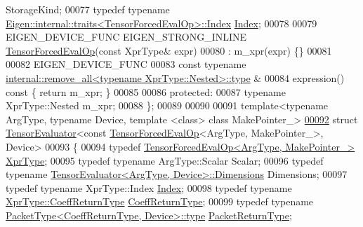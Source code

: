 \begin{DoxyCode}
       StorageKind;
00077   \textcolor{keyword}{typedef} \textcolor{keyword}{typename} \hyperlink{struct_eigen_1_1internal_1_1traits}{Eigen::internal::traits<TensorForcedEvalOp>::Index}
       \hyperlink{namespace_eigen_a62e77e0933482dafde8fe197d9a2cfde}{Index};
00078 
00079   EIGEN\_DEVICE\_FUNC EIGEN\_STRONG\_INLINE \hyperlink{class_eigen_1_1_tensor_forced_eval_op}{TensorForcedEvalOp}(\textcolor{keyword}{const} XprType& expr)
00080       : m\_xpr(expr) \{\}
00081 
00082     EIGEN\_DEVICE\_FUNC
00083     \textcolor{keyword}{const} \textcolor{keyword}{typename} \hyperlink{group___sparse_core___module}{internal::remove\_all<typename XprType::Nested>::type}
      &
00084     expression()\textcolor{keyword}{ const }\{ \textcolor{keywordflow}{return} m\_xpr; \}
00085 
00086   \textcolor{keyword}{protected}:
00087     \textcolor{keyword}{typename} XprType::Nested m\_xpr;
00088 \};
00089 
00090 
00091 \textcolor{keyword}{template}<\textcolor{keyword}{typename} ArgType, \textcolor{keyword}{typename} Device, \textcolor{keyword}{template} <\textcolor{keyword}{class}> \textcolor{keyword}{class }MakePointer\_>
\hyperlink{struct_eigen_1_1_tensor_evaluator_3_01const_01_tensor_forced_eval_op_3_01_arg_type_00_01_make_pointer___01_4_00_01_device_01_4}{00092} \textcolor{keyword}{struct }\hyperlink{struct_eigen_1_1_tensor_evaluator}{TensorEvaluator}<const \hyperlink{class_eigen_1_1_tensor_forced_eval_op}{TensorForcedEvalOp}<ArgType, MakePointer\_>, 
      Device>
00093 \{
00094   \textcolor{keyword}{typedef} \hyperlink{class_eigen_1_1_tensor_forced_eval_op}{TensorForcedEvalOp<ArgType, MakePointer\_>} 
      \hyperlink{class_eigen_1_1_tensor_forced_eval_op}{XprType};
00095   \textcolor{keyword}{typedef} \textcolor{keyword}{typename} ArgType::Scalar Scalar;
00096   \textcolor{keyword}{typedef} \textcolor{keyword}{typename} \hyperlink{struct_eigen_1_1_tensor_evaluator}{TensorEvaluator<ArgType, Device>::Dimensions}
       Dimensions;
00097   \textcolor{keyword}{typedef} \textcolor{keyword}{typename} XprType::Index \hyperlink{namespace_eigen_a62e77e0933482dafde8fe197d9a2cfde}{Index};
00098   \textcolor{keyword}{typedef} \textcolor{keyword}{typename} \hyperlink{group___sparse_core___module}{XprType::CoeffReturnType} 
      \hyperlink{group___sparse_core___module}{CoeffReturnType};
00099   \textcolor{keyword}{typedef} \textcolor{keyword}{typename} \hyperlink{group___sparse_core___module}{PacketType<CoeffReturnType, Device>::type} 
      \hyperlink{group___sparse_core___module}{PacketReturnType};

\end{DoxyCode}
